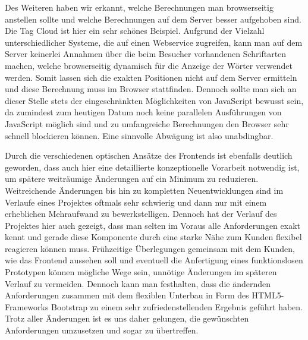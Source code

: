 Des Weiteren haben wir erkannt, welche Berechnungen man browserseitig anstellen sollte und welche Berechnungen auf dem Server besser aufgehoben sind. Die Tag Cloud ist hier ein sehr schönes Beispiel. Aufgrund der Vielzahl unterschiedlicher Systeme, die auf einen Webservice zugreifen, kann man auf dem Server keinerlei Annahmen über die beim Besucher vorhandenen Schriftarten machen, welche browserseitig dynamisch für die Anzeige der Wörter verwendet werden. Somit lassen sich die exakten Positionen nicht auf dem Server ermitteln und diese Berechnung muss im Browser stattfinden. Dennoch sollte man sich an dieser Stelle stets der eingeschränkten Möglichkeiten von JavaScript bewusst sein, da zumindest zum heutigen Datum noch keine parallelen Ausführungen von Java\-Script möglich sind und zu umfangreiche Berechnungen den Browser sehr schnell blockieren können.
Eine sinnvolle Abwägung ist also unabdingbar.

Durch die verschiedenen optischen Ansätze des Frontends ist ebenfalls deutlich geworden, dass auch hier eine detaillierte konzeptionelle Vorarbeit notwendig ist, um spätere weiträumige Änderungen auf ein Minimum zu reduzieren. Weitreichende Änderungen bis hin zu kompletten Neuentwicklungen sind im Verlaufe eines Projektes oftmals sehr schwierig und dann nur mit einem erheblichen Mehraufwand zu bewerkstelligen. Dennoch hat der Verlauf des Projektes hier auch gezeigt, dass man selten im Voraus alle Anforderungen exakt kennt und gerade diese Komponente durch eine starke Nähe zum Kunden flexibel reagieren können muss. Frühzeitige Überlegungen gemeinsam mit dem Kunden, wie das Frontend aussehen soll und eventuell die Anfertigung eines funktionslosen Prototypen können mögliche Wege sein, unnötige Änderungen im späteren Verlauf zu vermeiden.
Dennoch kann man festhalten, dass die ändernden Anforderungen zusammen mit dem flexiblen Unterbau in Form des HTML5-Frameworks Bootstrap \cite{Bootstrap} zu einem sehr zufriedenstellenden Ergebnis geführt haben. Trotz aller Änderungen ist es uns daher gelungen, die gewünschten Anforderungen umzusetzen und sogar zu übertreffen.